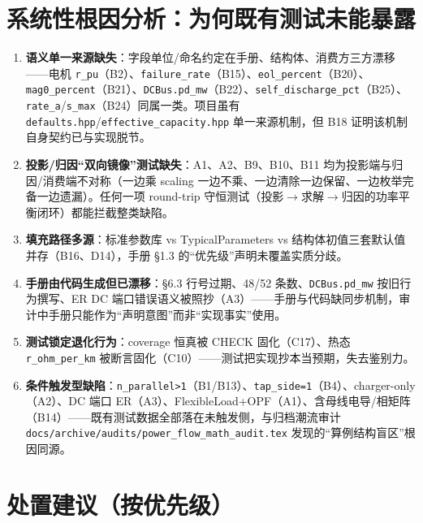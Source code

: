 \documentclass[11pt,a4paper,fontset=fandol]{ctexart}
\newcommand{\file}[1]{\texttt{#1}}
\begin{document}
\newpage
\section{系统性根因分析：为何既有测试未能暴露}
\label{sec:rootcause}

\begin{enumerate}
  \item \textbf{语义单一来源缺失}：字段单位/命名约定在手册、结构体、消费方三方漂移——电机 \texttt{r\_pu}（B2）、\texttt{failure\_rate}（B15）、\texttt{eol\_percent}（B20）、\texttt{mag0\_percent}（B21）、\texttt{DCBus.pd\_mw}（B22）、\texttt{self\_discharge\_pct}（B25）、\texttt{rate\_a}/\texttt{s\_max}（B24）同属一类。项目虽有 \file{defaults.hpp}/\file{effective\_capacity.hpp} 单一来源机制，但 B18 证明该机制自身契约已与实现脱节。
  \item \textbf{投影/归因``双向镜像''测试缺失}：A1、A2、B9、B10、B11 均为投影端与归因/消费端不对称（一边乘 scaling 一边不乘、一边清除一边保留、一边枚举完备一边遗漏）。任何一项 round-trip 守恒测试（投影$\to$求解$\to$归因的功率平衡闭环）都能拦截整类缺陷。
  \item \textbf{填充路径多源}：标准参数库 vs TypicalParameters vs 结构体初值三套默认值并存（B16、D14），手册 \S 1.3 的``优先级''声明未覆盖实质分歧。
  \item \textbf{手册由代码生成但已漂移}：\S 6.3 行号过期、48/52 条数、\texttt{DCBus.pd\_mw} 按旧行为撰写、ER DC 端口错误语义被照抄（A3）——手册与代码缺同步机制，审计中手册只能作为``声明意图''而非``实现事实''使用。
  \item \textbf{测试锁定退化行为}：coverage 恒真被 CHECK 固化（C17）、热态 \texttt{r\_ohm\_per\_km} 被断言固化（C10）——测试把实现抄本当预期，失去鉴别力。
  \item \textbf{条件触发型缺陷}：\texttt{n\_parallel>1}（B1/B13）、\texttt{tap\_side=1}（B4）、charger-only（A2）、DC 端口 ER（A3）、FlexibleLoad+OPF（A1）、含母线电导/相矩阵（B14）——既有测试数据全部落在未触发侧，与归档潮流审计 \file{docs/archive/audits/power\_flow\_math\_audit.tex} 发现的``算例结构盲区''根因同源。
\end{enumerate}

\section{处置建议（按优先级）}
\label{sec:recommend}
\end{document}
